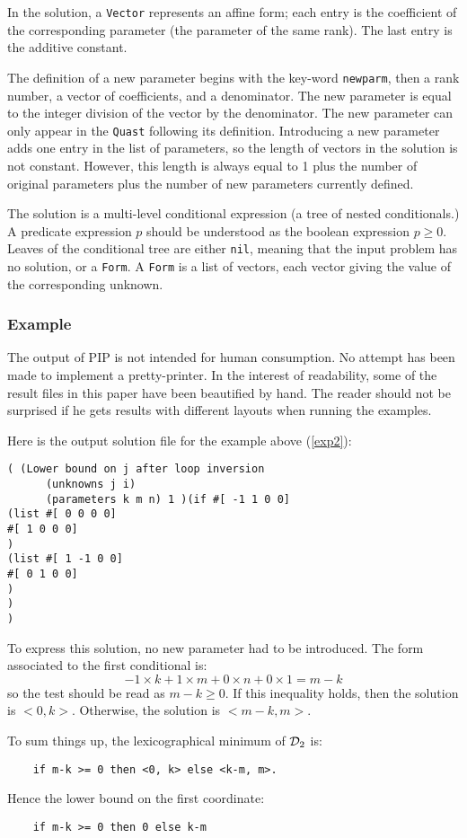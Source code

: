 \documentclass[12pt,a4paper,dvips]{article}
\begin{document}
In the solution, a {\tt Vector} represents an affine form; each entry
is the coefficient of the corresponding parameter (the parameter of
the same rank). The last entry is the additive constant.

The definition of a new parameter begins with the key-word
{\tt newparm}, then a rank number, a vector of coefficients, and a
denominator. The new parameter is equal to the integer division of the
vector by the denominator. The new parameter can only appear in the
{\tt Quast} following its definition. Introducing a new parameter adds
one entry in the list of parameters, so the length of vectors in the
solution is not constant. However, this length is always equal to 1 plus
the number of original parameters plus the number of new parameters
currently defined.

The solution is a multi-level conditional expression (a
tree of nested conditionals.) A predicate expression $p$ should be
understood as the boolean expression $p\geq 0$. Leaves of the
conditional tree are either {\tt nil}, meaning that the input problem
has no solution, or a {\tt Form}. A {\tt Form} is a list of vectors,
each vector giving the value of the corresponding unknown.

\subsubsection{Example}
The output of PIP is not intended for human consumption.
No attempt has been made to implement a pretty-printer. In the interest
of readability, some of the result files in this paper have been beautified
by hand. The reader should not be surprised if he gets results with
different layouts when running the examples.

Here is the output solution file for the example above (\ref{exp2}):
\begin{verbatim}
( (Lower bound on j after loop inversion
      (unknowns j i)
      (parameters k m n) 1 )(if #[ -1 1 0 0]
(list #[ 0 0 0 0]
#[ 1 0 0 0]
)
(list #[ 1 -1 0 0]
#[ 0 1 0 0]
)
)
)
\end{verbatim}
To express this solution, no new parameter had to be introduced. The
form associated to the first conditional is:
\[ -1 \times k + 1 \times m + 0 \times n + 0 \times 1 = m-k \]
so the test should be read as $m - k \geq 0$.  If this inequality
holds, then the solution is $<0, k>$. Otherwise, the solution is
$<m-k, m>$.

To sum things up, the lexicographical minimum of ${\cal D}_2$ is:
\begin{verbatim}
    if m-k >= 0 then <0, k> else <k-m, m>.
\end{verbatim}
Hence the lower bound on the first coordinate:
\begin{verbatim}
    if m-k >= 0 then 0 else k-m
\end{verbatim}
\end{document}
